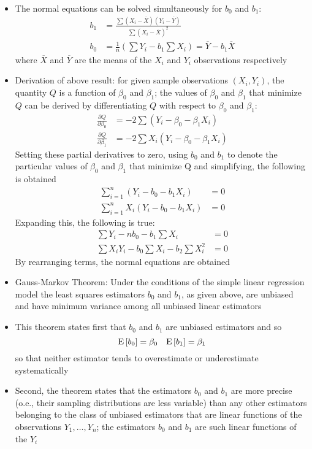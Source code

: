 \begin{itemize}
\item The normal equations can be solved simultaneously for $b_0$ and $b_1$: $$ \begin{aligned} 
b_1 &= \frac{ \sum (X_i - \overline{X})(Y_i - \overline{Y})}{\sum (X_i - \overline{X})^2} \\
b_0 &= \frac{1}{n} \left( \sum Y_i - b_1 \sum X_i \right) = \overline{Y} - b_1\overline{X} \end{aligned} $$ where $\overline{X}$ and $\overline{Y}$ are the means of the $X_i$ and $Y_i$ observations respectively
\item Derivation of above result: for given sample observations $(X_i, Y_i)$, the quantity $Q$ is a function of $\beta_0$ and $\beta_1$;  the values of $\beta_0$ and $\beta_1$ that minimize $Q$ can be derived by differentiating $Q$ with respect to $\beta_0$ and $\beta_1$: $$ \begin{aligned} \frac{\partial Q}{\partial \beta_0} &= -2\sum (Y_i - \beta_0 - \beta_1X_i) \\ \frac{\partial Q}{\partial \beta_1} &= -2\sum X_i(Y_i - \beta_0 - \beta_1X_i) \end{aligned} $$ 
Setting these partial derivatives to zero, using $b_0$ and $b_1$ to denote the particular values of $\beta_0$ and $\beta_1$ that minimize Q and simplifying, the following is obtained $$ \begin{aligned} \sum_{i=1}^n (Y_i - b_0 - b_1X_i) &= 0 \\ \sum_{i=1}^n X_i(Y_i - b_0 - b_1X_i) &= 0 \end{aligned} $$ Expanding this, the following is true: $$ \begin{aligned} \sum Y_i - nb_0 - b_1\sum X_i &= 0 \\ \sum X_iY_i - b_0\sum X_i - b_2\sum X_i^2 &= 0 \end{aligned} $$ 
By rearranging terms, the normal equations are obtained
\item Gauss-Markov Theorem: Under the conditions of the simple linear regression model the least squares estimators $b_0$ and $b_1$, as given above, are unbiased and have minimum variance among all unbiased linear estimators
\item This theorem states first that $b_0$ and $b_1$ are unbiased estimators and so $$ \mathrm{E}\left[ b_0 \right] = \beta_0 ~~~ \mathrm{E}\left[ b_1 \right] = \beta_1 $$ so that neither estimator tends to overestimate or underestimate systematically 
\item Second, the theorem states that the estimators $b_0$ and $b_1$ are more precise (o.e., their sampling distributions are less variable) than any other estimators belonging to the class of unbiased estimators that are linear functions of the observations $Y_1,\dots,Y_n$; the estimators $b_0$ and $b_1$ are such linear functions of the $Y_i$

\end{itemize}
